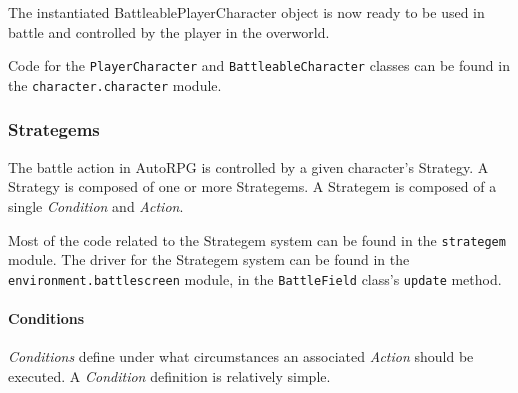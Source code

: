 \documentclass[11pt]{article}
\begin{document}
\singlespacing
{}
\doublespacing

The instantiated BattleablePlayerCharacter object is now ready to be used in battle and controlled by the player in the overworld.

Code for the \texttt{PlayerCharacter} and \texttt{BattleableCharacter} classes can be found in the \texttt{character.character} module.

\subsubsection{Strategems}

The battle action in AutoRPG is controlled by a given character's Strategy.  A Strategy is composed of one or more Strategems.  A Strategem is composed of a single \emph{Condition} and \emph{Action}.

Most of the code related to the Strategem system can be found in the \texttt{strategem} module.  The driver for the Strategem system can be found in the \texttt{environment.battlescreen} module, in the \texttt{BattleField} class's \texttt{update} method.

\paragraph{Conditions} \hfill %

\emph{Conditions} define under what circumstances an associated \emph{Action} should be executed. A \emph{Condition} definition is relatively simple.  

\singlespacing
{}
\doublespacing
\end{document}
